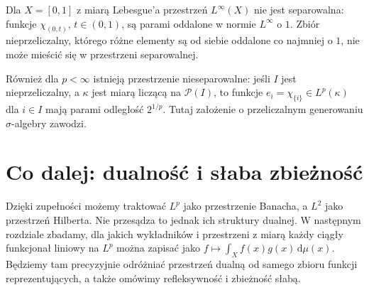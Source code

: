 \begin{przyklad}
Dla $X=[0,1]$ z miarą Lebesgue'a przestrzeń
$L^\infty(X)$ nie jest separowalna: funkcje
$\chi_{(0,t)}$, $t\in(0,1)$, są parami
oddalone w normie $L^\infty$ o $1$.
Zbiór nieprzeliczalny, którego różne elementy są
od siebie oddalone co najmniej o $1$, nie może
mieścić się w przestrzeni separowalnej.

Również dla $p<\infty$ istnieją przestrzenie
nieseparowalne: jeśli $I$ jest nieprzeliczalny,
a $\kappa$ jest miarą liczącą na $\mathcal P(I)$,
to funkcje $e_i=\chi_{\{i\}}\in L^p(\kappa)$
dla $i\in I$ mają parami odległość $2^{1/p}$.
Tutaj założenie o przeliczalnym generowaniu
$\sigma$-algebry zawodzi.
\end{przyklad}

\section{Co dalej: dualność i słaba zbieżność}
Dzięki zupełności możemy traktować $L^p$ jako
przestrzenie Banacha, a $L^2$ jako przestrzeń Hilberta.
Nie przesądza to jednak ich struktury dualnej.
W następnym rozdziale zbadamy, dla jakich
wykładników i przestrzeni z miarą każdy ciągły
funkcjonał liniowy na $L^p$ można zapisać jako
$f\mapsto\int_Xf(x)g(x)\,\mathrm d\mu(x)$.
Będziemy tam precyzyjnie odróżniać
przestrzeń dualną od samego zbioru funkcji reprezentujących,
a także omówimy refleksywność i zbieżność słabą.
